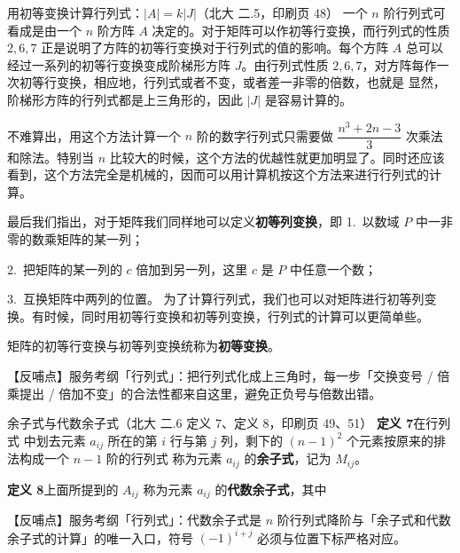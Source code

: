 \begin{fdeep}{用初等变换计算行列式：$|A|=k|J|$（北大 二.5，印刷页 48）}
一个 $n$ 阶行列式可看成是由一个 $n$ 阶方阵 $A$ 决定的。对于矩阵可以作初等行变换，而行列式的性质 $2,6,7$ 正是说明了方阵的初等行变换对于行列式的值的影响。每个方阵 $A$ 总可以经过一系列的初等行变换变成阶梯形方阵 $J$。由行列式性质 $2,6,7$，对方阵每作一次初等行变换，相应地，行列式或者不变，或者差一非零的倍数，也就是
显然，阶梯形方阵的行列式都是上三角形的，因此 $|J|$ 是容易计算的。

不难算出，用这个方法计算一个 $n$ 阶的数字行列式只需要做 $\dfrac{n^3+2n-3}{3}$ 次乘法和除法。特别当 $n$ 比较大的时候，这个方法的优越性就更加明显了。同时还应该看到，这个方法完全是机械的，因而可以用计算机按这个方法来进行行列式的计算。

最后我们指出，对于矩阵我们同样地可以定义\textbf{初等列变换}，即
1.\ 以数域 $P$ 中一非零的数乘矩阵的某一列；

2.\ 把矩阵的某一列的 $c$ 倍加到另一列，这里 $c$ 是 $P$ 中任意一个数；

3.\ 互换矩阵中两列的位置。
为了计算行列式，我们也可以对矩阵进行初等列变换。有时候，同时用初等行变换和初等列变换，行列式的计算可以更简单些。

矩阵的初等行变换与初等列变换统称为\textbf{初等变换}。

【反哺点】服务考纲「行列式」：把行列式化成上三角时，每一步「交换变号 / 倍乘提出 / 倍加不变」的合法性都来自这里，避免正负号与倍数出错。
\end{fdeep}

\begin{fdeep}{余子式与代数余子式（北大 二.6 定义 7、定义 8，印刷页 49、51）}
\textbf{定义 7}\quad 在行列式
中划去元素 $a_{ij}$ 所在的第 $i$ 行与第 $j$ 列，剩下的 $(n-1)^2$ 个元素按原来的排法构成一个 $n-1$ 阶的行列式
称为元素 $a_{ij}$ 的\textbf{余子式}，记为 $M_{ij}$。

\textbf{定义 8}\quad 上面所提到的 $A_{ij}$ 称为元素 $a_{ij}$ 的\textbf{代数余子式}，其中

【反哺点】服务考纲「行列式」：代数余子式是 $n$ 阶行列式降阶与「余子式和代数余子式的计算」的唯一入口，符号 $(-1)^{i+j}$ 必须与位置下标严格对应。
\end{fdeep}

